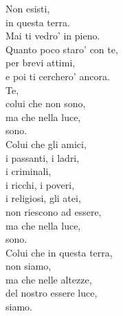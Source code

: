 \begin{haiku}
    Non esisti,\\
    in questa terra.\\
    Mai ti vedro' in pieno.\\
    Quanto poco staro' con te,\\
    per brevi attimi,\\
    e poi ti cerchero' ancora.\\
    Te,\\
    colui che non sono,\\
    ma che nella luce,\\
    sono.\\
    Colui che gli amici,\\
    i passanti, i ladri,\\
    i criminali,\\
    i ricchi, i poveri,\\
    i religiosi, gli atei,\\
    non riescono ad essere,\\
    ma che nella luce,\\
    sono.\\
    Colui che in questa terra,\\
    non siamo,\\
    ma che nelle altezze,\\
    del nostro essere luce,\\
    siamo.\\
\end{haiku}


